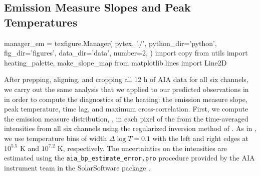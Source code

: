 \subsection{Emission Measure Slopes and Peak Temperatures}\label{sec:em_slopes}

\begin{pycode}[manager_em]
manager_em = texfigure.Manager(
    pytex, './',
    python_dir='python',
    fig_dir='figures',
    data_dir='data',
    number=2,
)
import copy
from utils import heating_palette, make_slope_map
from matplotlib.lines import Line2D
\end{pycode}

After prepping, aligning, and cropping all 12 h of AIA data for all six channels, we carry out the same analysis that we applied to our predicted observations in  in order to compute the diagnostics of the heating: the emission measure slope, peak temperature, time lag, and maximum cross-correlation.
First, we compute the emission measure distribution, \dem, in each pixel of the \AR{} from the time-averaged intensities from all six channels using the regularized inversion method of \citet{hannah_differential_2012}.
As in , we use temperature bins of width $\Delta\log T=0.1$ with the left and right edges at $10^{5.5}$ K and $10^{7.2}$ K, respectively.
The uncertainties on the intensities are estimated using the \texttt{aia\_bp\_estimate\_error.pro} procedure provided by the AIA instrument team in the SolarSoftware package \citep[SSW,][]{freeland_data_1998}.  

